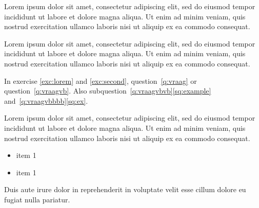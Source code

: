 \documentclass[a4paper,12pt]{extarticle}
\begin{document}

Lorem ipsum dolor sit amet, consectetur adipiscing elit, sed do eiusmod tempor incididunt ut labore et dolore magna aliqua. Ut enim ad minim veniam, quis nostrud exercitation ullamco laboris nisi ut aliquip ex ea commodo consequat. 

\label{q:vraagvbbbbb}%



Lorem ipsum dolor sit amet, consectetur adipiscing elit, sed do eiusmod tempor incididunt ut labore et dolore magna aliqua. Ut enim ad minim veniam, quis nostrud exercitation ullamco laboris nisi ut aliquip ex ea commodo consequat. 


 \label{q:vraagvbvbvb}


 \label{exc:second}

In exercise \ref{exc:lorem} and \ref{exc:second}, question~\ref{q:vraag} or question~\ref{q:vraagvb}. Also subquestion~\ref{q:vraagvbvb}\ref{sq:example} and~\ref{q:vraagvbbbb}\ref{sq:ex}.

Lorem ipsum dolor sit amet, consectetur adipiscing elit, sed do eiusmod tempor incididunt ut labore et dolore magna aliqua. Ut enim ad minim veniam, quis nostrud exercitation ullamco laboris nisi ut aliquip ex ea commodo consequat. 
\begin{itemize}
    \item item 1
    \item item 1
\end{itemize}
Duis aute irure dolor in reprehenderit in voluptate velit esse cillum dolore eu fugiat nulla pariatur. 
\end{document}
